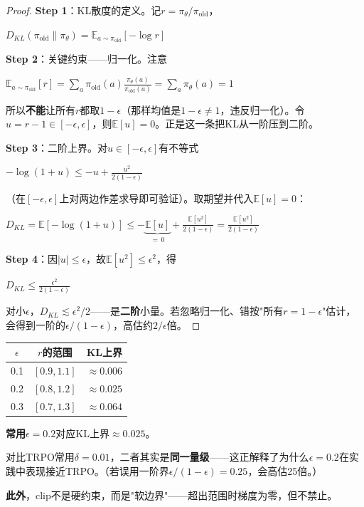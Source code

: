 \documentclass[11pt,a4paper]{article}
\theoremstyle{definition}
\begin{document}
\begin{proof}
\textbf{Step 1}：KL散度的定义。记$r=\pi_\theta/\pi_{\text{old}}$，

$D_{KL}(\pi_{\text{old}} \| \pi_\theta) = \mathbb{E}_{a \sim \pi_{\text{old}}}\left[-\log r\right]$

\textbf{Step 2}：关键约束——归一化。注意

$\mathbb{E}_{a\sim\pi_{\text{old}}}[r] = \sum_a \pi_{\text{old}}(a)\frac{\pi_\theta(a)}{\pi_{\text{old}}(a)} = \sum_a \pi_\theta(a) = 1$

所以\textbf{不能}让所有$r$都取$1-\epsilon$（那样均值是$1-\epsilon\ne1$，违反归一化）。令$u = r-1\in[-\epsilon,\epsilon]$，则$\mathbb{E}[u]=0$。正是这一条把KL从一阶压到二阶。

\textbf{Step 3}：二阶上界。对$u\in[-\epsilon,\epsilon]$有不等式

$-\log(1+u) \le -u + \frac{u^2}{2(1-\epsilon)}$

（在$[-\epsilon,\epsilon]$上对两边作差求导即可验证）。取期望并代入$\mathbb{E}[u]=0$：

$D_{KL} = \mathbb{E}[-\log(1+u)] \le -\underbrace{\mathbb{E}[u]}_{=\,0} + \frac{\mathbb{E}[u^2]}{2(1-\epsilon)} = \frac{\mathbb{E}[u^2]}{2(1-\epsilon)}$

\textbf{Step 4}：因$|u|\le\epsilon$，故$\mathbb{E}[u^2]\le\epsilon^2$，得

$D_{KL} \le \frac{\epsilon^2}{2(1-\epsilon)}$

对小$\epsilon$，$D_{KL}\lesssim \epsilon^2/2$——是\textbf{二阶}小量。若忽略归一化、错按"所有$r=1-\epsilon$"估计，会得到一阶的$\epsilon/(1-\epsilon)$，高估约$2/\epsilon$倍。
\end{proof}

\begin{calculation}[Clip参数与KL的对应]
\begin{center}
\begin{tabular}{c|c|c}
\toprule
$\epsilon$ & $r$的范围 & KL上界 \\
\midrule
0.1 & $[0.9, 1.1]$ & $\approx 0.006$ \\
0.2 & $[0.8, 1.2]$ & $\approx 0.025$ \\
0.3 & $[0.7, 1.3]$ & $\approx 0.064$ \\
\bottomrule
\end{tabular}
\end{center}

\textbf{常用$\epsilon = 0.2$}对应KL上界$\approx 0.025$。

对比TRPO常用$\delta = 0.01$，二者其实是\textbf{同一量级}——这正解释了为什么$\epsilon=0.2$在实践中表现接近TRPO。（若误用一阶界$\epsilon/(1-\epsilon)=0.25$，会高估25倍。）

\textbf{此外}，clip不是硬约束，而是"软边界"——超出范围时梯度为零，但不禁止。
\end{calculation}
\end{document}
